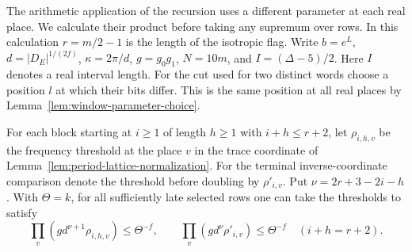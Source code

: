 The arithmetic application of the recursion uses a different parameter
at each real place. We calculate their product before taking any
supremum over rows. In this calculation \(r=m/2-1\) is the length of
the isotropic flag. Write \(b=e^L\), \(d=|D_E|^{1/(2f)}\),
\(\kappa=2\pi/d\), \(g=g_0g_1\), \(N=10m\), and
\(I=(\Delta-5)/2\). Here \(I\) denotes a real interval length.
For the cut used for two distinct words choose a position \(l\)
at which their bits differ. This is the same position at all real
places by Lemma~\ref{lem:window-parameter-choice}.

\begin{auxlemma}
\label{lem:selected-frequency-size}
For each block starting at \(i\ge1\) of length \(h\ge1\) with
\(i+h\le r+2\), let \(\rho_{i,h,v}\) be the frequency threshold
at the place \(v\) in the trace coordinate of
Lemma~\ref{lem:period-lattice-normalization}. For the terminal
inverse-coordinate comparison denote the threshold before doubling by
\(\rho'_{i,v}\). Put \(\nu=2r+3-2i-h\). With \(\Theta=k\), for all
sufficiently late selected rows one can take the thresholds to satisfy
\[
 \prod_v(gd^{\nu+1}\rho_{i,h,v})\le\Theta^{-f},\qquad
 \prod_v(gd^{\nu}\rho'_{i,v})\le\Theta^{-f}
       \quad(i+h=r+2).
\]
\end{auxlemma}
